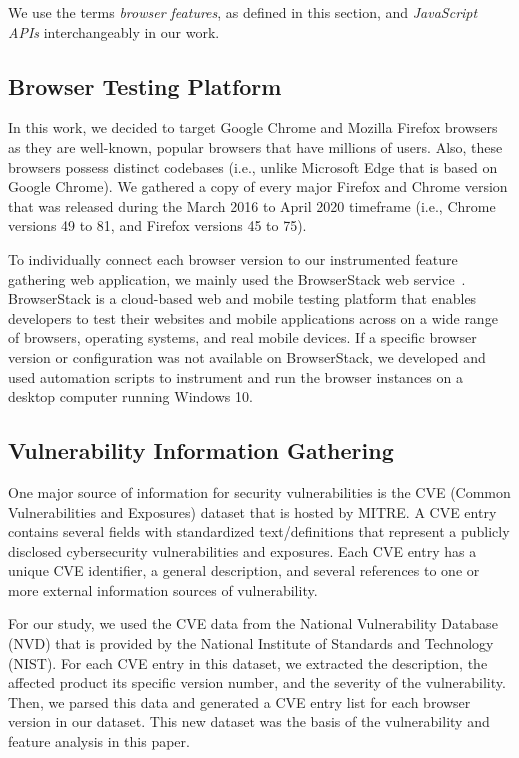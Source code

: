 We use the terms \textit{browser features}, as defined in this section, and \textit{JavaScript APIs} interchangeably in our work.




\subsection{Browser Testing Platform}

In this work, we decided to target Google Chrome and Mozilla
Firefox browsers as they are well-known, popular browsers that have
millions of users. Also, these browsers possess distinct codebases
(i.e., unlike Microsoft Edge that is based on Google Chrome). We
gathered a copy of every major Firefox and Chrome version that was
released during the March 2016 to April 2020 timeframe (i.e., Chrome
versions 49 to 81, and Firefox versions 45 to 75).

To individually connect each browser version to our instrumented
feature gathering web application, we mainly used the BrowserStack web
service~\cite{browserstack}. BrowserStack is a cloud-based web and mobile testing platform
that enables developers to test their websites and mobile applications
across on a wide range of browsers, operating systems, and real mobile
devices. If a specific browser version or configuration was not
available on BrowserStack, we developed and used automation scripts to
instrument and run the browser instances on a desktop computer running
Windows 10.

\subsection{Vulnerability Information Gathering}

One major source of information for security vulnerabilities is the
CVE (Common Vulnerabilities and Exposures) dataset that is hosted by
MITRE. A CVE entry contains several fields with standardized
text/definitions that represent a publicly disclosed cybersecurity
vulnerabilities and exposures. Each CVE entry has a unique CVE
identifier, a general description, and several references to one or
more external information sources of vulnerability.

For our study, we used the CVE data from the National Vulnerability
Database (NVD) that is provided by the National Institute of Standards
and Technology (NIST). For each CVE entry in this dataset, we
extracted the description, the affected product its specific version
number, and the severity of the vulnerability. Then, we parsed this
data and generated a CVE entry list for each browser version in our
dataset. This new dataset was the basis of the vulnerability and
feature analysis in this paper.
